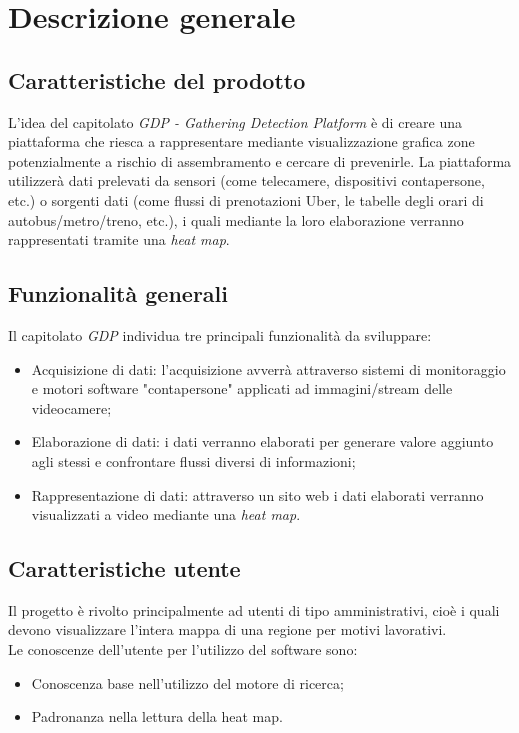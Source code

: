 \chapter{Descrizione generale}
\section{Caratteristiche del prodotto}
L'idea del capitolato \textit{GDP - Gathering Detection Platform} è di creare una piattaforma che riesca a rappresentare mediante visualizzazione grafica zone potenzialmente a rischio di assembramento e cercare di prevenirle.
La piattaforma utilizzerà dati prelevati da sensori (come telecamere, dispositivi contapersone, etc.) o sorgenti dati (come flussi di prenotazioni Uber, le tabelle degli orari di autobus/metro/treno, etc.), i quali mediante la loro elaborazione verranno rappresentati tramite una \textit{heat map}.

\section{Funzionalità generali}
Il capitolato \textit{GDP} individua tre principali funzionalità da sviluppare:
\begin{itemize}
	\item Acquisizione di dati: l'acquisizione avverrà attraverso sistemi di monitoraggio e motori software "contapersone" applicati ad immagini/stream delle videocamere;
	\item Elaborazione di dati: i dati verranno elaborati per generare valore aggiunto agli stessi e confrontare flussi diversi di informazioni;
	\item Rappresentazione di dati: attraverso un sito web i dati elaborati verranno visualizzati a video mediante una \textit{heat map}.
\end{itemize}

\section{Caratteristiche utente}
Il progetto è rivolto principalmente ad utenti di tipo amministrativi, cioè i quali devono visualizzare l'intera mappa di una regione per motivi lavorativi. \\
Le conoscenze dell'utente per l'utilizzo del software sono:
\begin{itemize}
	\item Conoscenza base nell'utilizzo del motore di ricerca;
	\item Padronanza nella lettura della heat map.
\end{itemize}	

